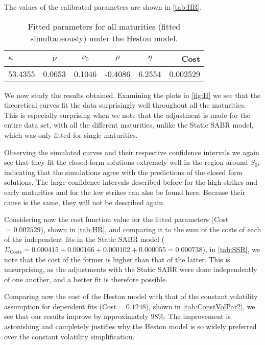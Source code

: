 The values of the calibrated parameters are shown in \autoref{tab:HR}.

\begin{table}[H]
    \centering
        \renewcommand{\arraystretch}{0.8}
\begin{tabular}{@{}lccccr@{}}
\toprule
$\kappa$ & $\overline{\nu}$ & $\nu_0$ & $\rho$ & $\eta$ & Cost \\ \midrule
53.4355 & 0.0653 & 0.1046 & -0.4086 & 6.2554 & 0.002529 \\
\bottomrule
\end{tabular}
  \caption[Fitted parameters for all maturities (fitted simultaneously) under the Heston model.]{Fitted parameters for all maturities (fitted simultaneously) under the Heston model.}
  \label{tab:HR}
\end{table}


We now study the results obtained. Examining the plots in \autoref{fig:H} we see that the theoretical curves fit the data surprisingly well throughout all the maturities.
This is especially surprising when we note that the adjustment is made for the entire data set, with all the different maturities, unlike the Static SABR model, which was only fitted for single maturities.

Observing the simulated curves and their respective confidence intervals we again see that they fit the closed-form solutions extremely well in the region around $S_0$, indicating that the simulations agree with the predictions of the closed form solutions. The large confidence intervals described before for the high strikes and early maturities and for the low strikes can also be found here. Because their cause is the same, they will not be described again.

Considering now the cost function value for the fitted parameters (Cost$=0.002529$), shown in \autoref{tab:HR}, and comparing it to the sum of the costs of each of the independent fits in the Static SABR model ($\Sigma_{\mathrm{Costs}}=0.000415+0.000166+0.000102+0.000055=0.000738$), in \autoref{tab:SSR}, we note that the cost of the former is higher than that of the latter.
This is unsurprising, as the adjustments with the Static SABR were done independently of one another, and a better fit is therefore possible.

Comparing now the cost of the Heston model with that of the constant volatility assumption for dependent fits (Cost$=0.1248$), shown in \autoref{tab:ConstVolPar2}, we see that our results improve by approximately $98\%$. The improvement is astonishing and completely justifies why the Heston model is so widely preferred over the constant volatility simplification.


